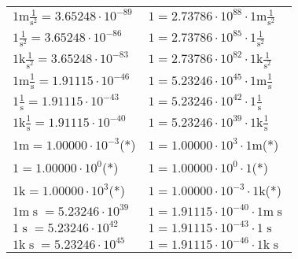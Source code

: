 \begin{center}
\begin{longtable}{l l}
{\color{gray}$1 \bm{\mathrm{ m}}{}\frac1{\operatorname{s}^2}{}{} = 3.65248\cdot10^{-89} $}   & {\color{gray}$ 1 = 2.73786\cdot10^{88} \cdot 1 \bm{\mathrm{ m}}{}\frac1{\operatorname{s}^2}{}{}$}  \\
{\color{black}$1 \bm{\mathrm{ }}{}\frac1{\operatorname{s}^2}{}{} = 3.65248\cdot10^{-86} $}   & {\color{black}$ 1 = 2.73786\cdot10^{85} \cdot 1 \bm{\mathrm{ }}{}\frac1{\operatorname{s}^2}{}{}$}  \\
{\color{gray}$1 \bm{\mathrm{ k}}{}\frac1{\operatorname{s}^2}{}{} = 3.65248\cdot10^{-83} $}   & {\color{gray}$ 1 = 2.73786\cdot10^{82} \cdot 1 \bm{\mathrm{ k}}{}\frac1{\operatorname{s}^2}{}{}$}  \\
{\color{gray}$1 \bm{\mathrm{ m}}{}\frac1{\operatorname{s}}{}{} = 1.91115\cdot10^{-46} $}   & {\color{gray}$ 1 = 5.23246\cdot10^{45} \cdot 1 \bm{\mathrm{ m}}{}\frac1{\operatorname{s}}{}{}$}  \\
{\color{black}$1 \bm{\mathrm{ }}{}\frac1{\operatorname{s}}{}{} = 1.91115\cdot10^{-43} $}   & {\color{black}$ 1 = 5.23246\cdot10^{42} \cdot 1 \bm{\mathrm{ }}{}\frac1{\operatorname{s}}{}{}$}  \\
{\color{gray}$1 \bm{\mathrm{ k}}{}\frac1{\operatorname{s}}{}{} = 1.91115\cdot10^{-40} $}   & {\color{gray}$ 1 = 5.23246\cdot10^{39} \cdot 1 \bm{\mathrm{ k}}{}\frac1{\operatorname{s}}{}{}$}  \\
{\color{gray}$1 \bm{\mathrm{ m}}{}{}{}{} = 1.00000\cdot10^{-3} $}\quad(*) & {\color{gray}$ 1 = 1.00000\cdot10^{3} \cdot 1 \bm{\mathrm{ m}}{}{}{}{}$}\quad(*)\\
{\color{black}$1 \bm{\mathrm{ }}{}{}{}{} = 1.00000\cdot10^{0} $}\quad(*) & {\color{black}$ 1 = 1.00000\cdot10^{0} \cdot 1 \bm{\mathrm{ }}{}{}{}{}$}\quad(*)\\
{\color{gray}$1 \bm{\mathrm{ k}}{}{}{}{} = 1.00000\cdot10^{3} $}\quad(*) & {\color{gray}$ 1 = 1.00000\cdot10^{-3} \cdot 1 \bm{\mathrm{ k}}{}{}{}{}$}\quad(*)\\
{\color{gray}$1 \bm{\mathrm{ m}}{}{\operatorname{s}}{}{} = 5.23246\cdot10^{39} $}   & {\color{gray}$ 1 = 1.91115\cdot10^{-40} \cdot 1 \bm{\mathrm{ m}}{}{\operatorname{s}}{}{}$}  \\
{\color{black}$1 \bm{\mathrm{ }}{}{\operatorname{s}}{}{} = 5.23246\cdot10^{42} $}   & {\color{black}$ 1 = 1.91115\cdot10^{-43} \cdot 1 \bm{\mathrm{ }}{}{\operatorname{s}}{}{}$}  \\
{\color{gray}$1 \bm{\mathrm{ k}}{}{\operatorname{s}}{}{} = 5.23246\cdot10^{45} $}   & {\color{gray}$ 1 = 1.91115\cdot10^{-46} \cdot 1 \bm{\mathrm{ k}}{}{\operatorname{s}}{}{}$}  \\

\end{longtable}
\end{center}
